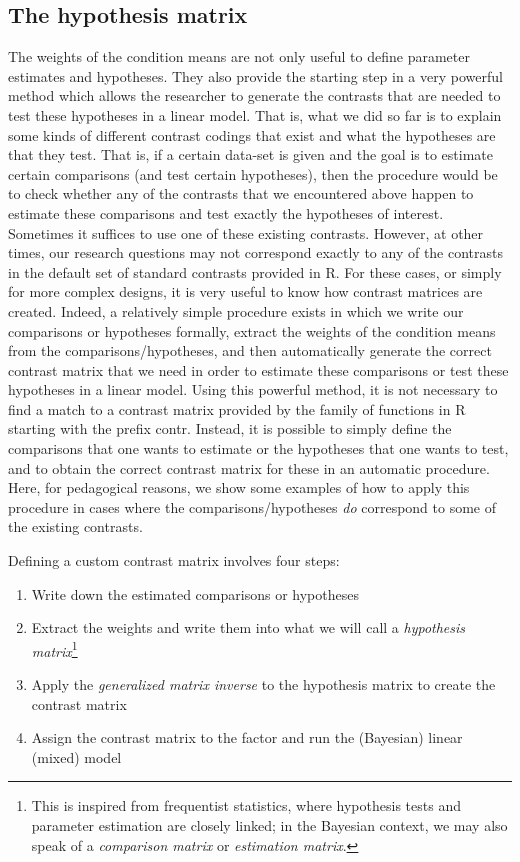 \documentclass[12pt,]{krantz}
\providecommand{\tightlist}{%
  \setlength{\itemsep}{0pt}\setlength{\parskip}{0pt}}
\theoremstyle{definition}
\theoremstyle{definition}
\theoremstyle{definition}
\theoremstyle{remark}
\begin{document}
\hypertarget{the-hypothesis-matrix}{%
\subsection{The hypothesis matrix}\label{the-hypothesis-matrix}}

The weights of the condition means are not only useful to define parameter estimates and hypotheses. They also provide the starting step in a very powerful method which allows the researcher to generate the contrasts that are needed to test these hypotheses in a linear model. That is, what we did so far is to explain some kinds of different contrast codings that exist and what the hypotheses are that they test. That is, if a certain data-set is given and the goal is to estimate certain comparisons (and test certain hypotheses), then the procedure would be to check whether any of the contrasts that we encountered above happen to estimate these comparisons and test exactly the hypotheses of interest. Sometimes it suffices to use one of these existing contrasts. However, at other times, our research questions may not correspond exactly to any of the contrasts in the default set of standard contrasts provided in R. For these cases, or simply for more complex designs, it is very useful to know how contrast matrices are created. Indeed, a relatively simple procedure exists in which we write our comparisons or hypotheses formally, extract the weights of the condition means from the comparisons/hypotheses, and then automatically generate the correct contrast matrix that we need in order to estimate these comparisons or test these hypotheses in a linear model. Using this powerful method, it is not necessary to find a match to a contrast matrix provided by the family of functions in R starting with the prefix contr. Instead, it is possible to simply define the comparisons that one wants to estimate or the hypotheses that one wants to test, and to obtain the correct contrast matrix for these in an automatic procedure. Here, for pedagogical reasons, we show some examples of how to apply this procedure in cases where the comparisons/hypotheses \emph{do} correspond to some of the existing contrasts.

Defining a custom contrast matrix involves four steps:

\begin{enumerate}
\def\labelenumi{\arabic{enumi}.}
\tightlist
\item
  Write down the estimated comparisons or hypotheses
\item
  Extract the weights and write them into what we will call a \emph{hypothesis matrix}\footnote{This is inspired from frequentist statistics, where hypothesis tests and parameter estimation are closely linked; in the Bayesian context, we may also speak of a \emph{comparison matrix} or \emph{estimation matrix}.}
\item
  Apply the \emph{generalized matrix inverse} to the hypothesis matrix to create the contrast matrix
\item
  Assign the contrast matrix to the factor and run the (Bayesian) linear (mixed) model
\end{enumerate}
\end{document}
